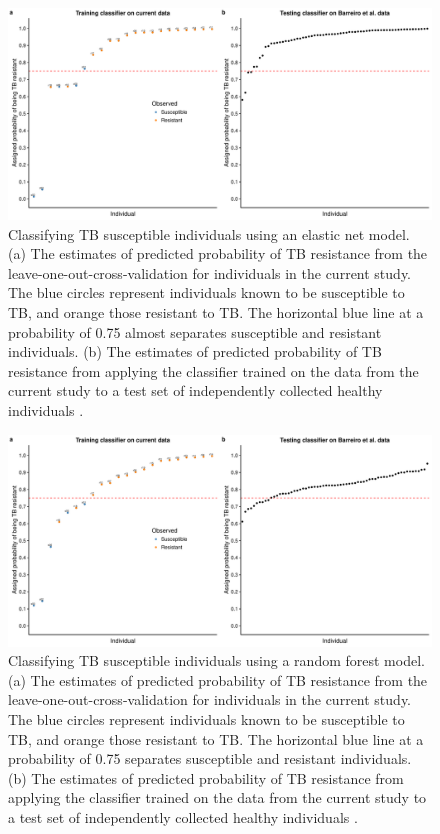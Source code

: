 \documentclass[fleqn,10pt]{wlscirep}
\begin{document}
\begin{figure}[ht]
\centering
\includegraphics[width=\linewidth]{../figure/classifier-en.pdf}
\caption{
Classifying TB susceptible individuals using an elastic net model. (a)
The estimates of predicted probability of TB resistance from the
leave-one-out-cross-validation for individuals in the current study.
The blue circles represent individuals known to be susceptible to TB,
and orange those resistant to TB. The horizontal blue line at a
probability of 0.75 almost separates susceptible and resistant
individuals. (b) The estimates of predicted probability of TB
resistance from applying the classifier trained on the data from the
current study to a test set of independently collected healthy
individuals \cite{Barreiro2012}.
}
\label{fig:class-en}
\end{figure}

\begin{figure}[ht]
\centering
\includegraphics[width=\linewidth]{../figure/classifier-rf.pdf}
\caption{
Classifying TB susceptible individuals using a random forest model.
(a) The estimates of predicted probability of TB resistance from the
leave-one-out-cross-validation for individuals in the current study.
The blue circles represent individuals known to be susceptible to TB,
and orange those resistant to TB. The horizontal blue line at a
probability of 0.75 separates susceptible and resistant individuals.
(b) The estimates of predicted probability of TB resistance from
applying the classifier trained on the data from the current study to
a test set of independently collected healthy individuals
\cite{Barreiro2012}.
}
\label{fig:class-rf}
\end{figure}
\end{document}
